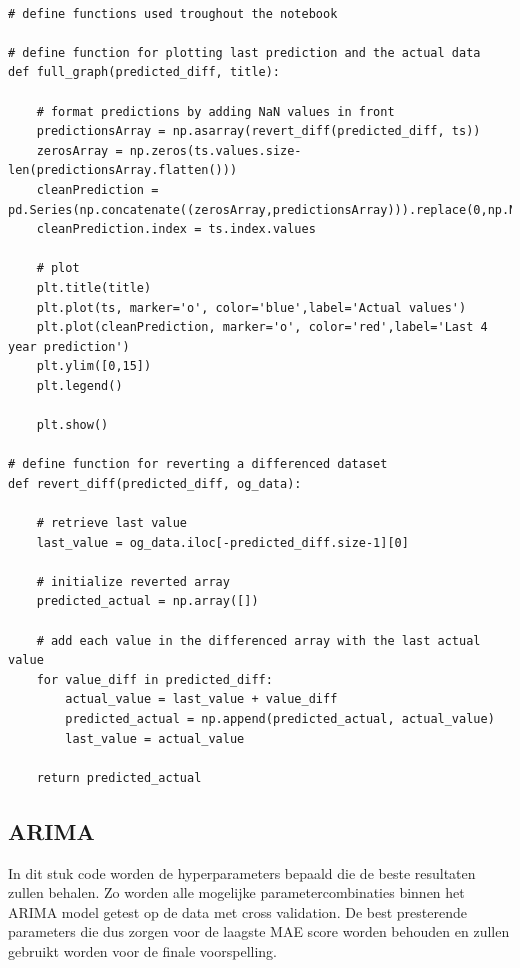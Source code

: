 \begin{verbatim}

# define functions used troughout the notebook

# define function for plotting last prediction and the actual data
def full_graph(predicted_diff, title):

    # format predictions by adding NaN values in front
    predictionsArray = np.asarray(revert_diff(predicted_diff, ts))
    zerosArray = np.zeros(ts.values.size-len(predictionsArray.flatten()))
    cleanPrediction = pd.Series(np.concatenate((zerosArray,predictionsArray))).replace(0,np.NaN)
    cleanPrediction.index = ts.index.values
    
    # plot
    plt.title(title)
    plt.plot(ts, marker='o', color='blue',label='Actual values')
    plt.plot(cleanPrediction, marker='o', color='red',label='Last 4 year prediction')
    plt.ylim([0,15])
    plt.legend()
    
    plt.show()

# define function for reverting a differenced dataset
def revert_diff(predicted_diff, og_data):

    # retrieve last value
    last_value = og_data.iloc[-predicted_diff.size-1][0]
    
    # initialize reverted array
    predicted_actual = np.array([])
    
    # add each value in the differenced array with the last actual value
    for value_diff in predicted_diff:
        actual_value = last_value + value_diff
        predicted_actual = np.append(predicted_actual, actual_value)
        last_value = actual_value
    
    return predicted_actual
\end{verbatim}




\subsection{ARIMA}

In dit stuk code worden de hyperparameters bepaald die de beste resultaten zullen behalen. Zo worden alle mogelijke parametercombinaties binnen het ARIMA model getest op de data met cross validation. De best presterende parameters die dus zorgen voor de laagste MAE score worden behouden en zullen gebruikt worden voor de finale voorspelling.

